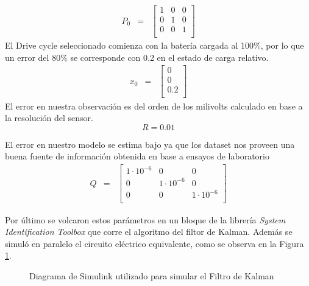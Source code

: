 \documentclass[10pt,a4paper]{article}
\begin{document}
	\begin{equation}
		\begin{array}{llll}
			P_0 & = & \begin{bmatrix}
				1 & 0 & 0 \\
				0 & 1 & 0 \\
				0 & 0 & 1 \\
			\end{bmatrix} 
		\end{array} \nonumber
	\end{equation}
	El Drive cycle seleccionado comienza con la batería cargada al 100\%, por lo que un error del 80\% se corresponde con 0.2 en el estado de carga relativo.
	\begin{equation}
		\begin{array}{llll}
			x_0 & = & \begin{bmatrix}
				0 \\
				0 \\
				0.2 \\
			\end{bmatrix} 
		\end{array} \nonumber
	\end{equation}
	El error en nuestra observación es del orden de los milivolts calculado en base a la resolución del sensor.
	\begin{equation}
		R = 0.01  \nonumber
	\end{equation}
	
	El error en nuestro modelo se estima bajo ya que los dataset nos proveen una buena fuente de información obtenida en base a ensayos de laboratorio
	\begin{equation}
		\begin{array}{llll}
			Q & = & \begin{bmatrix}
				1\cdot10^{-6} & 0 & 0 \\
				0 & 1\cdot10^{-6} & 0 \\
				0 & 0 & 1\cdot10^{-6} \\
			\end{bmatrix} 
		\end{array} \nonumber
	\end{equation}
	
	Por último se volcaron estos parámetros en un bloque de la librería \emph{System Identification Toolbox} que corre el algoritmo del filtor de Kalman. Además se simuló en paralelo el circuito eléctrico equivalente, como se observa en la Figura \ref{simulink_diagram}.
	\begin{figure}[h!]
		\begin{center}
			\caption{Diagrama de Simulink utilizado para simular el Filtro de Kalman}
			\label{simulink_diagram}
		\end{center}
	\end{figure}
	
\end{document}
